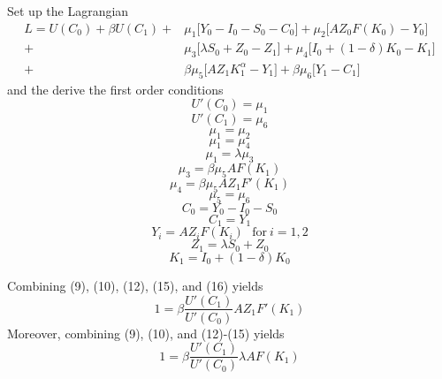 \documentclass{article}
\begin{document}
	Set up the Lagrangian
	\begin{equation}
	\begin{split}
	L =  U(C_0) + \beta U(C_1)  + &\mu_{1}\big[ Y_0 - I_0 - S_0 - C_0   \big]  + \mu_{2}\big[  A Z_0 F(K_0) - Y_0  \big]  \\
	+ &\mu_{3}\big[ \lambda S_0 + Z_0 -  Z_{1}  \big]   + \mu_{4}\big[ I_0 + (1 - \delta)K_0 -  K_{1}  \big]  \\
	+ &\beta \mu_5 \big[  AZ_1 K_1^{\alpha} - Y_1  \big] + \beta \mu_6 \big[  Y_1 - C_1   \big]
	\end{split}
	\end{equation}
	and the derive the first order conditions
	\begin{equation}
	U'(C_0) = \mu_{1}
	\end{equation}
	\begin{equation}
	U'(C_1) = \mu_{6}
	\end{equation}
	\begin{equation}
	\mu_{1} = \mu_{2}
	\end{equation}
	\begin{equation}
	\mu_{1} = \mu_{4}
	\end{equation}
	\begin{equation}
	\mu_{1} = \lambda \mu_{3}
	\end{equation}
	\begin{equation}
	\mu_{3} = \beta  \mu_{5} A F(K_{1})
	\end{equation}
	\begin{equation}
	\mu_4 = \beta  \mu_{5} A Z_{1} F'(K_{1})
	\end{equation}
	\begin{equation}
	\mu_5 = \mu_{6}
	\end{equation}
	\begin{equation}
	C_0 = Y_0 - I_0 - S_0
	\end{equation}
	\begin{equation}
	C_1 = Y_1
	\end{equation}
	\begin{equation}
	Y_i = A Z_i F(K_i) \ \ \ \text{for} \ i = 1,2
	\end{equation}
	\begin{equation}
	Z_{1} = \lambda S_0 + Z_0
	\end{equation}
	\begin{equation}
	K_{1} = I_0 + (1 - \delta)K_0
	\end{equation}
	
	
	Combining (9), (10), (12), (15), and (16) yields
	\begin{equation}
	1 =  \beta \frac{U'(C_{1})}{U'(C_0)}  A Z_{1} F'(K_{1}) 
	\end{equation}
	Moreover, combining (9), (10), and (12)-(15) yields
	\begin{equation}
	1 =  \beta \frac{U'(C_{1})}{U'(C_0)} \lambda  A F(K_{1}) 
	\end{equation}
	
\end{document}
